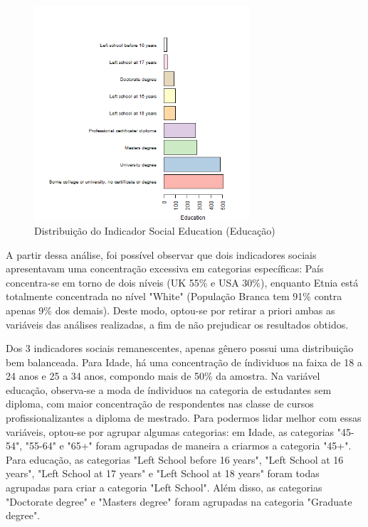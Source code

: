 \documentclass[
	article,			%
	11pt,				%
	oneside,			%
	a4paper,			%
	english,			%
	brazil,				%
	sumario=tradicional
	]{abntex2}
\begin{document}
\begin{figure}[H]
    \centering
    \includegraphics[width=8cm]{figuras/dist_educacao.png}
    \caption{Distribuição do Indicador Social Education (Educação)}
    \label{soc3}
\end{figure}

A partir dessa análise, foi possível observar que dois indicadores sociais apresentavam uma concentração excessiva em categorias específicas: País concentra-se em torno de dois níveis (UK 55\% e USA 30\%), enquanto Etnia está totalmente concentrada no nível "White" (População Branca tem 91\% contra apenas 9\% dos demais). Deste modo, optou-se por retirar a priori ambas as variáveis das análises realizadas, a fim de não prejudicar os resultados obtidos. 

Dos 3 indicadores sociais remanescentes, apenas gênero possui uma distribuição bem balanceada. Para Idade, há uma concentração de índividuos na faixa de 18 a 24 anos e 25 a 34 anos, compondo mais de 50\% da amostra. Na variável educação, observa-se a moda de índividuos na categoria de estudantes sem diploma, com maior concentração de respondentes nas classe de cursos profissionalizantes a diploma de mestrado. Para podermos lidar melhor com essas variáveis, optou-se por agrupar algumas categorias: em Idade, as categorias "45-54", "55-64" e "65+" foram agrupadas de maneira a criarmos a categoria "45+". Para educação, as categorias "Left School before 16 years", "Left School at 16 years", "Left School at 17 years" \hspace{0.05cm} e "Left School at 18 years" \hspace{0.05cm} foram todas agrupadas para criar a categoria "Left School". Além disso, as categorias "Doctorate degree" \hspace{0.05cm} e "Masters degree" \hspace{0.05cm} foram agrupadas na categoria "Graduate degree".
\end{document}

